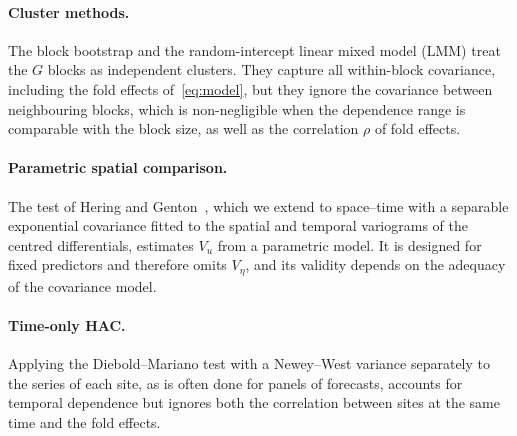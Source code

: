 \paragraph{Cluster methods.}
The block bootstrap and the random-intercept linear mixed model (LMM) treat the $G$ blocks as independent clusters. They capture all within-block covariance, including the fold effects of~\eqref{eq:model}, but they ignore the covariance between neighbouring blocks, which is non-negligible when the dependence range is comparable with the block size, as well as the correlation $\rho$ of fold effects.

\paragraph{Parametric spatial comparison.}
The test of Hering and Genton~\cite{hering2011}, which we extend to space--time with a separable exponential covariance fitted to the spatial and temporal variograms of the centred differentials, estimates $V_u$ from a parametric model. It is designed for fixed predictors and therefore omits $V_\eta$, and its validity depends on the adequacy of the covariance model.

\paragraph{Time-only HAC.}
Applying the Diebold--Mariano test with a Newey--West variance separately to the series of each site, as is often done for panels of forecasts, accounts for temporal dependence but ignores both the correlation between sites at the same time and the fold effects.

